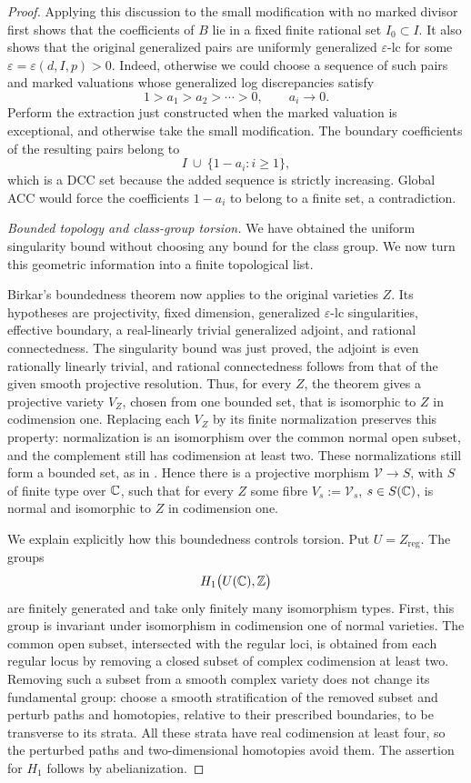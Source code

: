 \begin{proof}
Applying this discussion to the small modification with no marked divisor
first shows that the coefficients of $B$ lie in a fixed finite rational
set $I_0\subset I$.  It also shows that the original generalized pairs
are uniformly generalized $\varepsilon$-lc for some
$\varepsilon=\varepsilon(d,I,p)>0$.  Indeed, otherwise we could choose a
sequence of such pairs and marked valuations whose generalized log
discrepancies satisfy
\[
 1>a_1>a_2>\cdots>0,\qquad a_i\longrightarrow0.
\]
Perform the extraction just constructed when the marked valuation is
exceptional, and otherwise take the small modification.  The boundary
coefficients of the resulting pairs belong to
\[
 I\ \cup\ \{1-a_i:i\geq1\},
\]
which is a DCC set because the added sequence is strictly increasing.
Global ACC would force the coefficients $1-a_i$ to belong to a finite
set, a contradiction.

\smallskip
\noindent\emph{Bounded topology and class-group torsion.}
We have obtained the uniform singularity bound without choosing any
bound for the class group. We now turn this geometric information into
a finite topological list.

Birkar's boundedness theorem
\cite[Theorem~1.7]{BirkarBoundedCY} now applies to the original varieties
$Z$.  Its hypotheses are
projectivity, fixed dimension, generalized $\varepsilon$-lc singularities,
effective boundary, a real-linearly trivial generalized adjoint, and
rational connectedness.  The singularity bound was just proved, the
adjoint is even rationally linearly trivial, and rational connectedness follows
from that of the given smooth projective resolution.  Thus, for every $Z$,
the theorem gives a projective variety $V_Z$, chosen from one bounded set,
that is isomorphic to $Z$ in codimension one.  Replacing each $V_Z$ by its
finite normalization preserves this property: normalization is an
isomorphism over the common normal open subset, and the complement still
has codimension at least two.  These normalizations still form a bounded set,
as in \cite[Section~9.5]{BirkarBoundedCY}.  Hence there is a projective
morphism $\mathcal V\to S$, with $S$ of finite type over $\mathbb C$, such that for
every $Z$ some fibre $V_s:=\mathcal V_s$, $s\in S(\mathbb C)$, is normal and
isomorphic to $Z$ in codimension one.

We explain explicitly how this boundedness controls torsion.  Put
$U=Z_{\mathrm{reg}}$.  The groups
\[
 H_1\bigl(U(\mathbb C),\mathbb Z\bigr)
\]
are finitely generated and take only finitely many isomorphism types.
First, this group is invariant under isomorphism in codimension one of
normal varieties.  The common open subset, intersected with the regular
loci, is obtained from each regular locus by removing a closed subset of
complex codimension at least two.  Removing such a subset from a smooth
complex variety does not change its fundamental group: choose a smooth
stratification of the removed subset and perturb paths and homotopies,
relative to their prescribed boundaries, to be transverse to its strata.
All these strata have real codimension at least four, so the perturbed
paths and two-dimensional homotopies avoid them.  The assertion for
$H_1$ follows by abelianization.


\end{proof}
